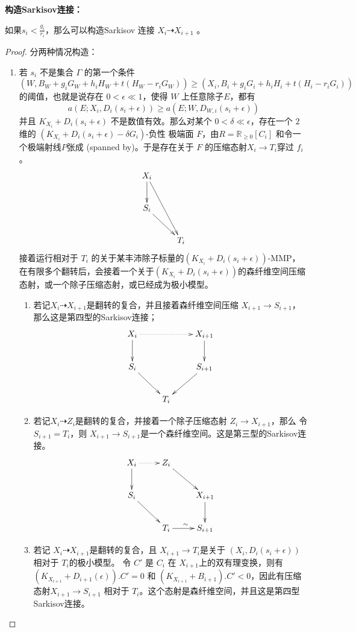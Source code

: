 \textbf{构造Sarkisov连接：}
\begin{proposition}[构造Sarkisov 连接]\label{2Constructlink}
 如果$s_{i}<\frac{g_{i}}{r_{i}}$，那么可以构造Sarkisov 连接 $X_{i}\dashrightarrow X_{i+1}$ 。
\end{proposition}
\begin{proof}
  分两种情况构造：
  \begin{enumerate}
  \item 若 $s_{i}$ 不是集合 $\Gamma$ 的第一个条件
    \[\left(W,B_{W}+g_{i}G_{W}+h_{i}H_{W}+t(H_{W}-r_{i}G_{W})\right)\geqslant \left(X_{i},B_{i}+g_{i}G_{i}+h_{i}H_{i}+t\left(H_{i}-r_{i}G_{i}\right)\right)\]
    的阈值，也就是说存在 $0<\epsilon\ll 1$，使得 $W$ 上任意除子$E$，都有
  \[ a(E;X_{i},D_{i}(s_{i}+\epsilon))\geqslant a(E;W,D_{W,i}(s_{i}+\epsilon)) \]
  并且 $K_{X_{i}}+D_{i}(s_{i}+\epsilon)$ 不是数值有效。那么对某个 $0< \delta \ll \epsilon $，存在一个 $2$ 维的 $(K_{X_{i}}+D_{i}(s_{i}+\epsilon)-\delta G_{i})$-负性 极端面 $F$，由$R=\mathbb{R}_{\geqslant 0}[C_{i}]$ 和令一个极端射线$P$张成 (spanned by)。于是存在关于 $F$   的压缩态射$X_{i}\to T_{i}$穿过 $f_{i}$。 
  \[ \xymatrix{
      X_{i}\ar[d]\ar[rdd]& \\
      S_{i}\ar[rd]&\\
         &T_{i} } \]
  接着运行相对于 $T_{i}$ 的关于某丰沛除子标量的$(K_{X_{i}}+D_{i}(s_{i}+\epsilon))$-MMP，在有限多个翻转后，会接着一个关于$(K_{X_{i}}+D_{i}(s_{i}+\epsilon))$的森纤维空间压缩态射，或一个除子压缩态射，或已经成为极小模型。
  \begin{enumerate}
    \item  若记$X_{i}\dashrightarrow X_{i+1}$是翻转的复合，并且接着森纤维空间压缩 $X_{i+1}\to S_{i+1}$，那么这是第四型的Sarkisov连接；
      \[ \xymatrix{
          X_{i}\ar@{.>}[rr]\ar[d]& &X_{i+1}\ar[d] \\
          S_{i}\ar[rd]& & S_{i+1}\ar[ld]\\
             &T_{i}& } \]
    \item 若记$X_{i}\dashrightarrow Z_{i}$是翻转的复合，并接着一个除子压缩态射 $Z_{i}\to X_{i+1}$，那么 令 $S_{i+1}=T_{i}$，则 $X_{i+1}\to S_{i+1}$是一个森纤维空间。这是第三型的Sarkisov连接。
      \[ \xymatrix{
          X_{i}\ar@{.>}[r]\ar[d]& Z_{i}\ar[rd] \\
          S_{i}\ar[rd]& & X_{i+1}\ar[d]\\
               &T_{i}\ar[r]^{\sim}& S_{i+1} } \]
    \item 若记 $X_{i}\dashrightarrow X_{i+1}$是翻转的复合，且 $X_{i+1}\to T_{i}$是关于 $\left(X_{i},D_{i}\left(s_{i}+\epsilon\right)\right)$ 相对于 $T_{i}$的极小模型。 令  $C'$ 是  $C_{i}$ 在 $X_{i+1}$上的双有理变换，则有 $(K_{X_{i+1}}+D_{i+1}(\epsilon)).C'=0$ 和 $(K_{X_{i+1}}+B_{i+1}).C'<0$，因此有压缩态射$X_{i+1} \to S_{i+1}$ 相对于 $T_i$。这个态射是森纤维空间，并且这是第四型Sarkisov连接。

\end{enumerate}
\end{enumerate}
\end{proof}
